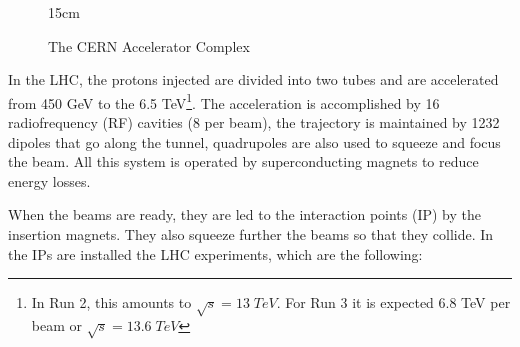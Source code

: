 \begin{figure}[!htm]{15cm} %
\caption{The CERN Accelerator Complex}%
\label{fig:acc_complex}
\end{figure}

In the LHC, the protons injected are divided into two tubes and are accelerated from 450 GeV to the 6.5 TeV\footnote{In Run 2, this amounts to $\sqrt{s} = 13 \; TeV$. For Run 3 it is expected 6.8 TeV per beam or $\sqrt{s} = 13.6 \; TeV$}. The acceleration is accomplished by 16 radiofrequency (RF) cavities (8 per beam), the trajectory is maintained by 1232 dipoles that go along the tunnel, quadrupoles are also used to squeeze and focus the beam. All this system is operated by superconducting magnets to reduce energy losses.

When the beams are ready, they are led to the interaction points (IP) by the insertion magnets. They also squeeze further the beams so that they collide. In the IPs are installed the LHC experiments, which are the following:

